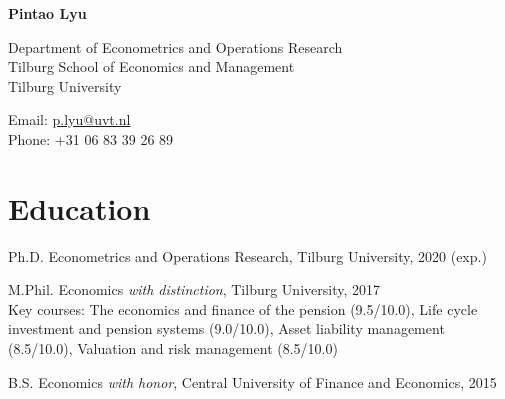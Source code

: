 \documentclass[12pt,letterpaper]{report}
\newcommand{\myname}{Pintao Lyu}
\newcommand{\namefont}[1]{{\normalfont\bfseries\Huge{#1}}}
\begin{document}
    \raggedright

    \namefont{\myname}

    \vspace{1em}
    \begin{minipage}[t]{0.68\textwidth}
        Department of Econometrics and Operations Research \\
        Tilburg School of Economics and Management \\
        Tilburg University
    \end{minipage}
    \begin{minipage}[t]{0.31\textwidth}
        Email: \href{mailto:p.lyu@uvt.nl}{p.lyu@uvt.nl} \\
        Phone: +31 06 83 39 26 89 \\
    \end{minipage}
    \vspace{0.5em}



    \section*{Education}

    \begin{tablist}

        \item[Ph.D.] \tab Econometrics and Operations Research, Tilburg University, 2020 (exp.)

        \item[M.Phil.]  \tab Economics \textit{with distinction}, Tilburg University, 2017 \\
        Key courses: The economics and finance of the pension (9.5/10.0), Life cycle investment and pension systems (9.0/10.0), Asset liability management (8.5/10.0), Valuation and risk management (8.5/10.0)

        \item[B.S.]  \tab Economics \textit{with honor}, Central University of Finance and Economics, 2015

    \end{tablist}
\end{document}
